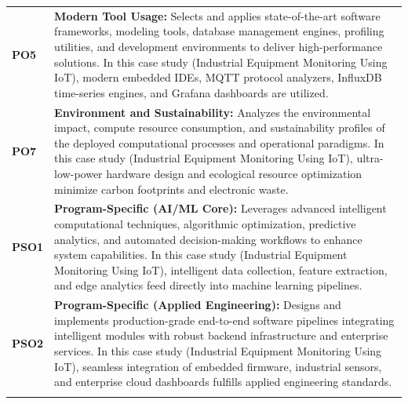 {\begin{longtable}{@{}>{\centering\arraybackslash}p{1.8cm} p{13.2cm}@{}}
    \addlinespace
\textbf{PO5} & \textbf{Modern Tool Usage:} Selects and applies state-of-the-art software frameworks, modeling tools, database management engines, profiling utilities, and development environments to deliver high-performance solutions. In this case study (Industrial Equipment Monitoring Using IoT), modern embedded IDEs, MQTT protocol analyzers, InfluxDB time-series engines, and Grafana dashboards are utilized. \\
    \addlinespace
\textbf{PO7} & \textbf{Environment and Sustainability:} Analyzes the environmental impact, compute resource consumption, and sustainability profiles of the deployed computational processes and operational paradigms. In this case study (Industrial Equipment Monitoring Using IoT), ultra-low-power hardware design and ecological resource optimization minimize carbon footprints and electronic waste. \\
    \addlinespace
\textbf{PSO1} & \textbf{Program-Specific (AI/ML Core):} Leverages advanced intelligent computational techniques, algorithmic optimization, predictive analytics, and automated decision-making workflows to enhance system capabilities. In this case study (Industrial Equipment Monitoring Using IoT), intelligent data collection, feature extraction, and edge analytics feed directly into machine learning pipelines. \\
    \addlinespace
\textbf{PSO2} & \textbf{Program-Specific (Applied Engineering):} Designs and implements production-grade end-to-end software pipelines integrating intelligent modules with robust backend infrastructure and enterprise services. In this case study (Industrial Equipment Monitoring Using IoT), seamless integration of embedded firmware, industrial sensors, and enterprise cloud dashboards fulfills applied engineering standards. \\
    \addlinespace
    \bottomrule
\end{longtable}}